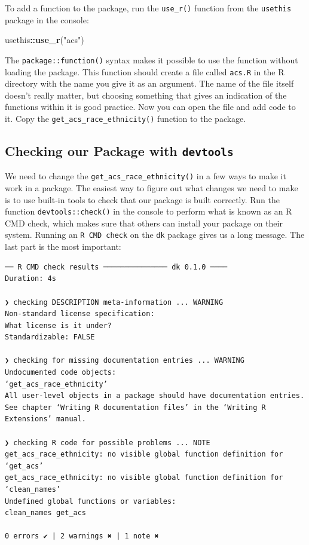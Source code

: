 \documentclass[
]{book}
\newenvironment{Shaded}{\begin{snugshade}}{\end{snugshade}}
\newcommand{\FunctionTok}[1]{\textcolor[rgb]{0.13,0.29,0.53}{\textbf{#1}}}
\newcommand{\NormalTok}[1]{#1}
\newcommand{\SpecialCharTok}[1]{\textcolor[rgb]{0.81,0.36,0.00}{\textbf{#1}}}
\newcommand{\StringTok}[1]{\textcolor[rgb]{0.31,0.60,0.02}{#1}}
\begin{document}
To add a function to the package, run the \texttt{use\_r()} function from the \texttt{usethis} package in the console:

\begin{Shaded}
\begin{Highlighting}[]
\NormalTok{usethis}\SpecialCharTok{::}\FunctionTok{use\_r}\NormalTok{(}\StringTok{"acs"}\NormalTok{)}
\end{Highlighting}
\end{Shaded}

The \texttt{package::function()} syntax makes it possible to use the function without loading the package. This function should create a file called \texttt{acs.R} in the R directory with the name you give it as an argument. The name of the file itself doesn't really matter, but choosing something that gives an indication of the functions within it is good practice. Now you can open the file and add code to it. Copy the \texttt{get\_acs\_race\_ethnicity()} function to the package.

\hypertarget{checking-our-package-with-devtools}{%
\subsection*{\texorpdfstring{Checking our Package with \texttt{devtools}}{Checking our Package with devtools}}\label{checking-our-package-with-devtools}}

We need to change the \texttt{get\_acs\_race\_ethnicity()} in a few ways to make it work in a package. The easiest way to figure out what changes we need to make is to use built-in tools to check that our package is built correctly. Run the function \texttt{devtools::check()} in the console to perform what is known as an R CMD check, which makes sure that others can install your package on their system. Running an \texttt{R\ CMD\ check} on the \texttt{dk} package gives us a long message. The last part is the most important:

\begin{verbatim}
── R CMD check results ─────────────── dk 0.1.0 ────
Duration: 4s

❯ checking DESCRIPTION meta-information ... WARNING
Non-standard license specification:
What license is it under?
Standardizable: FALSE

❯ checking for missing documentation entries ... WARNING
Undocumented code objects:
‘get_acs_race_ethnicity’
All user-level objects in a package should have documentation entries.
See chapter ‘Writing R documentation files’ in the ‘Writing R
Extensions’ manual.

❯ checking R code for possible problems ... NOTE
get_acs_race_ethnicity: no visible global function definition for
‘get_acs’
get_acs_race_ethnicity: no visible global function definition for
‘clean_names’
Undefined global functions or variables:
clean_names get_acs

0 errors ✔ | 2 warnings ✖ | 1 note ✖
\end{verbatim}
\end{document}
